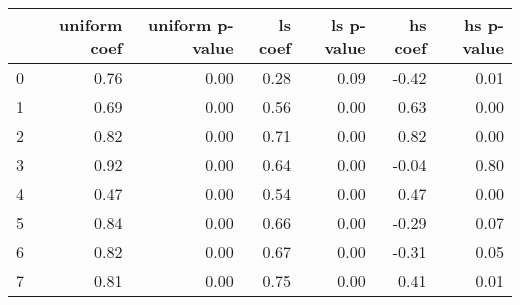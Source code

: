 \begin{tabular}{lrrrrrr}
\toprule
 & uniform coef & uniform p-value & ls coef & ls p-value & hs coef & hs p-value \\
\midrule
0 & 0.76 & 0.00 & 0.28 & 0.09 & -0.42 & 0.01 \\
1 & 0.69 & 0.00 & 0.56 & 0.00 & 0.63 & 0.00 \\
2 & 0.82 & 0.00 & 0.71 & 0.00 & 0.82 & 0.00 \\
3 & 0.92 & 0.00 & 0.64 & 0.00 & -0.04 & 0.80 \\
4 & 0.47 & 0.00 & 0.54 & 0.00 & 0.47 & 0.00 \\
5 & 0.84 & 0.00 & 0.66 & 0.00 & -0.29 & 0.07 \\
6 & 0.82 & 0.00 & 0.67 & 0.00 & -0.31 & 0.05 \\
7 & 0.81 & 0.00 & 0.75 & 0.00 & 0.41 & 0.01 \\
\bottomrule
\end{tabular}
